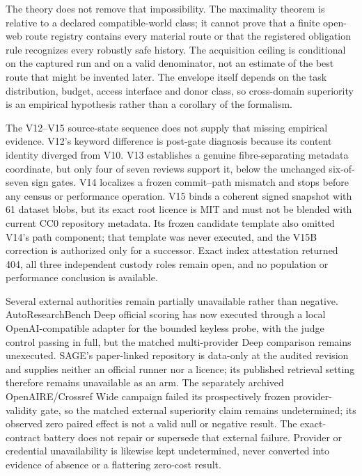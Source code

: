 \documentclass[11pt]{article}
\theoremstyle{definition}
\newcommand{\idt}[1]{\path{#1}}
\begin{document}
The theory does not remove that impossibility.  The maximality theorem is
relative to a declared compatible-world class; it cannot prove that a finite
open-web route registry contains every material route or that the registered
obligation rule recognizes every robustly safe history.  The acquisition
ceiling is conditional on the captured run and on a valid denominator, not an
estimate of the best route that might be invented later.  The envelope itself
depends on the task distribution, budget, access interface and donor class, so
cross-domain superiority is an empirical hypothesis rather than a corollary of
the formalism.

The V12--V15 source-state sequence does not supply that missing empirical
evidence.  V12's keyword difference is post-gate diagnosis because its content
identity diverged from V10.  V13 establishes a genuine fibre-separating metadata
coordinate, but only four of seven reviews support it, below the unchanged
six-of-seven sign gates.  V14 localizes a frozen commit--path mismatch and stops
before any census or performance operation.  V15 binds a coherent signed
snapshot with 61 dataset blobs, but its exact root licence is MIT and must not
be blended with current CC0 repository metadata.  Its frozen candidate template
also omitted V14's \idt{/output/} path component; that template was never
executed, and the V15B correction is authorized only for a successor.  Exact
index attestation returned 404, all three independent custody roles remain
open, and no population or performance conclusion is available.

Several external authorities remain partially unavailable rather than negative. AutoResearchBench Deep official scoring has now executed through a local OpenAI-compatible adapter for the bounded keyless probe, with the judge control passing in full, but the matched multi-provider Deep comparison remains unexecuted. SAGE's paper-linked repository is data-only at the audited revision and supplies neither an official runner nor a licence; its published retrieval setting therefore remains unavailable as an arm. The separately archived OpenAIRE/Crossref Wide campaign failed its prospectively frozen provider-validity gate, so the matched external superiority claim remains undetermined; its observed zero paired effect is not a valid null or negative result. The exact-contract battery does not repair or supersede that external failure. Provider or credential unavailability is likewise kept undetermined, never converted into evidence of absence or a flattering zero-cost result.
\end{document}
